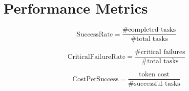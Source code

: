 \section*{Performance Metrics}

\[
\text{SuccessRate}=\frac{\#\text{completed tasks}}{\#\text{total tasks}}
\]

\[
\text{CriticalFailureRate}=\frac{\#\text{critical failures}}{\#\text{total tasks}}
\]

\[
\text{CostPerSuccess}=\frac{\text{token cost}}{\#\text{successful tasks}}
\]
